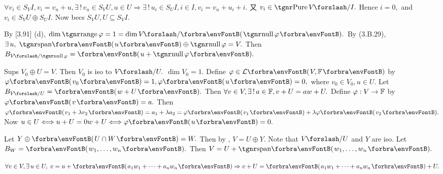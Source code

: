 $\forall v_i\in S_V I,v_i=v_u+u,\exists\,!\,v_u\in S_V U,u\in U\Rightarrow\exists\,!\,u_i\in S_U I,i\in I,v_i=v_u+u_i+i.$\parSol{}
又 $v_i\in\Pure V\XSlash I.$ Hence $i=0,$ and $v_i\in S_V U\oplus S_U I.$ Now becs $S_V U,U\subseteq S_V I.$\PfEnd
\SepLine

By [3.91] (d), $\dim\range\varphi=1=\dim V\XSlash \Par{\null \varphi}.$\parSol{}
\Or By ({3.B.29}), $\exists\,u,\;\Span{u}\oplus\null\varphi=V.$ Then $B_{V\XSlash \null\varphi}=\Par{u+\null\varphi}.$\PfEnd\vspace{-2pt}
\SepLine

Sups $V_{\!0}\oplus U=V.$ Then $V_{\!0}$ is iso to $V\XSlash U.$ $\dim V_{\!0}=1.$\parSol{}
Define $\varphi\in\Lm{V,\Fbb}$ by $\varphi\Par{v_0}=1,\varphi\Par{u}=0,$ where $v_0\in V_{\!0},u\in U.$\PfEnd\parSol{\vspace{4pt}}
\Or Let $B_{V\XSlash U}=\Par{w+U}.$ Then $\forall v\in V,\exists\,!\,a\in{\mathbb{F}},v+U=aw+U.$\parSol{}
Define $\varphi:{V\rightarrow{\mathbb{F}}}$ by $\varphi\Par{v}=a.$ Then $\varphi\Par{v_1+\lambda v_2}=a_1+\lambda a_2=\varphi\Par{v_1}+\lambda\varphi\Par{v_2}.$\parSol{}
Now $u\in U\Longleftrightarrow u+U=0w+U\Longleftrightarrow\varphi\Par{u}=0.$\PfEnd
\SepLine

\par\quad
Let $Y\oplus\Par{U\cap W}=W.$ Then by , $V=U\oplus Y.$ Note that $V\XSlash U$ and $Y$ are iso.\PfEnd\vspace{2pt}\quad
\Or Let $B_W=\Par{w_1,\dots,w_n}.$ Then $V=U+\Span{w_1,\dots,w_n}.$\par\quad
$\forall v\in V,\exists\,u\in U,\;v=u+\Par{a_1w_1+\dots+a_nw_n}\Rightarrow v+U=\Par{a_1w_1+\dots+a_nw_n}+U.$\PfEnd
\SepLine

